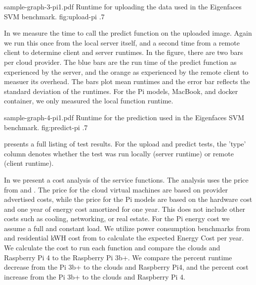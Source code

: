 \OneFIGURE
    {sample-graph-3-pi1.pdf}
    {Runtime for uploading the data used in the Eigenfaces SVM benchmark.}
    {fig:upload-pi}
    {.7}
    

In  we measure the time to call the predict
function on the uploaded image. Again we run this once from the local
server itself, and a second time from a remote client to determine
client and server runtimes. In the figure, there are two bars per
cloud provider. The blue bars are the run time of the predict function
as experienced by the server, and the orange as experienced by the
remote client to measuer its overhead. The bars plot mean runtimes and
the error bar reflects
the standard deviation of the runtimes. For the Pi models, MacBook,
and docker container, we only measured the local function runtime.

\OneFIGURE
    {sample-graph-4-pi1.pdf}
    {Runtime for the prediction used in the Eigenfaces SVM benchmark.}
    {fig:predict-pi}
    {.7}


 presents a full listing of test results. For the upload
    and predict tests, the 'type' column denotes whether the test was
    run locally (server runtime) or remote (client runtime). 

In  we present a cost analysis of the service
functions. The analysis uses the price from 
and . The price for the cloud virtual machines are based
on provider advertised costs, while the price for the Pi models are
based on the hardware cost and one year of energy cost amortized for
one year. This does not include other costs such as cooling,
networking, or real estate. For the Pi energy cost we assume a full
and constant load. We utilize power consumption benchmarks
from \cite{pi-power} and  residential kWH cost
from \cite{indiana-energy} to calculate the expected Energy Cost per
year. We calculate the cost to run each function and compare the
clouds and Raspberry Pi 4 to the Raspberry Pi 3b+. We compare the
percent runtime decrease from the Pi 3b+ to the clouds and Raspberry
Pi4, and the percent cost increase from the Pi 3b+ to the clouds and
Raspberry Pi 4.

